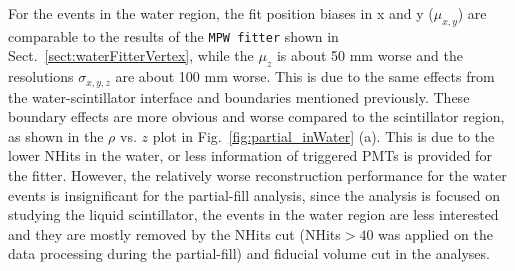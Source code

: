 For the events in the water region, the fit position biases in x and y ($\mu_{x,y}$) are comparable to the results of the \texttt{MPW fitter} shown in Sect.~\ref{sect:waterFitterVertex}, while the $\mu_z$ is about 50 mm worse and the resolutions $\sigma_{x,y,z}$ are about 100 mm worse. This is due to the same effects from the water-scintillator interface and boundaries mentioned previously. These boundary effects are more obvious and worse compared to the scintillator region, as shown in the $\rho$ vs. $z$ plot in Fig.~\ref{fig:partial_inWater} (a). This is due to the lower NHits in the water, or less information of triggered PMTs is provided for the fitter. However, the relatively worse reconstruction performance for the water events is insignificant for the partial-fill analysis, since the analysis is focused on studying the liquid scintillator, the events in the water region are less interested and they are mostly removed by the NHits cut (NHits$>40$ was applied on the data processing during the partial-fill) and fiducial volume cut in the analyses. 

